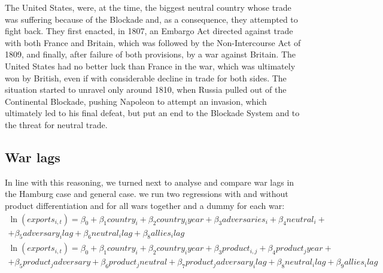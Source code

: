 \documentclass[12pt,a4paper,notitlepage,english]{article}
\begin{document}
The United States, were, at the time, the biggest neutral country whose trade was suffering because of the Blockade and, as a consequence, they attempted to fight back. They first enacted, in 1807, an Embargo Act directed against trade with both France and Britain, which was followed by the Non-Intercourse Act of 1809, and finally, after failure of both provisions, by a war against Britain. The United States had no better luck than France in the war, which was ultimately won by British, even if with considerable decline in trade for both sides. The situation started to unravel only around 1810, when Russia pulled out of the Continental Blockade, pushing Napoleon to attempt an invasion, which ultimately led to his final defeat, but put an end to the Blockade System and to the threat for neutral trade. 


\iffalse
\subsection{War lags}
In line with this reasoning, we turned next to analyse and compare war lags in the Hamburg case and general case. we run two regressions with and without product differentiation and for all wars together and a dummy for each war: 
\begin{multline}
\ln(exports_{i,t})=\beta_0+\beta_1country_i+\beta_2country_iyear+\beta_3adversaries_i+\beta_4neutral_i+\\+\beta_5adversary_ilag+\beta_6neutral_ilag+\beta_8allies_ilag
\end{multline}
\begin{multline}
\ln(exports_{i,t})=\beta_0+\beta_1country_i+\beta_2country_iyear+\beta_3product_{i,j}+\beta_4product_jyear+\\+\beta_5product_jadversary+ \beta_6product_jneutral+\beta_7product_jadversary_ilag+\beta_8neutral_ilag+\beta_9allies_ilag
\end{multline}
\end{document}
